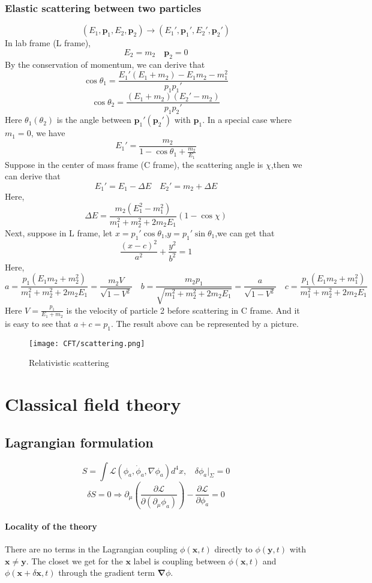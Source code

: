\documentclass[cyan]{elegantnote}
\begin{document}
\subsection{Elastic scattering between two particles}
\[(E_1,\bm{p}_1,E_2,\bm{p}_2) \to (E_1',\bm{p}_1',E_2',\bm{p}_2')\]
In lab frame (L frame),
\[E_2 = m_2 \quad \bm{p}_2 = 0\]
By the conservation of momentum, we can derive that
\[\cos \theta_1 = \frac{E_1'(E_1+m_2)-E_1 m_2 - m_1^2}{p_1 p_1'}\]
\[\cos \theta_2 = \frac{(E_1+m_2)(E_2'-m_2)}{p_1 p_2'}\]
Here $\theta_1(\theta_2)$ is the angle between $\bm{p}_1'(\bm{p}_2')$ with $\bm{p}_1$.
In a special case where $m_1 =0$, we have
\[E_1' = \frac{m_2}{1-\cos\theta_1 + \frac{m_2}{E_1}}\]
Suppose in the center of mass frame (C frame), the scattering angle is $\chi$,then we can derive that
\[E_1' = E_1 - \Delta E \quad E_2' = m_2 + \Delta E\]
Here,
\[\Delta E = \frac{m_2(E_1^2-m_1^2)}{m_1^2 + m_2^2 + 2m_2E_1}(1-\cos\chi)\]
Next, suppose in L frame, let $x = p_1'\cos\theta_1$,$y = p_1'\sin\theta_1$,we can get that
\[\frac{(x-c)^2}{a^2}+\frac{y^2}{b^2}=1\]
Here,
\[a = \frac{p_1(E_1m_2+m_2^2)}{m_1^2 + m_2^2 + 2m_2 E_1} = \frac{m_2V}{\sqrt{1-V^2}} \quad b = \frac{m_2 p_1}{\sqrt{m_1^2 + m_2^2 + 2m_2 E_1}} = \frac{a}{\sqrt{1-V^2}} \quad c = \frac{ p_1(E_1m_2+m_1^2)}{m_1^2 + m_2^2 + 2m_2 E_1}\]
Here $V = \frac{p_1}{E_1 + m_2}$ is the velocity of particle 2 before scattering in C frame. And it is easy to see that $a + c = p_1$. The result above can be represented by a picture.
\begin{figure}[!h]
	\centering
	\texttt{[image: CFT/scattering.png]}
	\caption{Relativistic scattering}
\end{figure}

\chapter{Classical field theory}
\section{Lagrangian formulation}
\[S = \int \mathcal{L}(\phi_a,\dot{\phi}_a,\nabla \phi_a) d^4 x, \ \ \ \ \delta \phi_a |_{\Sigma} = 0\]
\[\delta S = 0 \Rightarrow \partial_{\mu} \left (\frac{\partial \mathcal{L}}{\partial (\partial_{\mu} \phi_a)} \right ) - \frac{\partial \mathcal{L}}{\partial \phi_a} = 0\]
\subsubsection{Locality of the theory}
There are no terms in the Lagrangian coupling $\phi(\bm{x},t)$ directly to  $\phi(\bm{y},t)$ with $\bm{x} \neq \bm{y}$. The closet we get for the $\bm{x}$ label is coupling between $\phi(\bm{x},t)$ and $\phi(\bm{x}+\delta\bm{x},t)$ through the gradient term $\bm{\nabla} \phi$.
\end{document}
